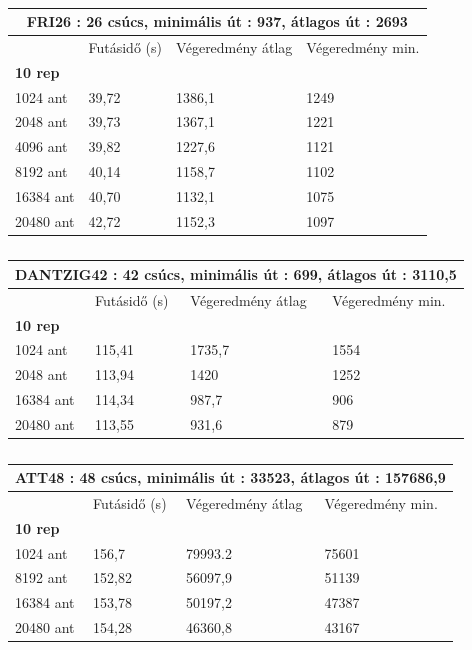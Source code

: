 \begin{table}[ht!]
	\centering
	\begin{tabular}{|p{2cm}||p{3cm}|p{3.5cm}|p{3.5cm}|}
		\hline
		\multicolumn{4}{|c|}{FRI26 : 26 csúcs, minimális út : 937, átlagos út : 2693} \\
		\hline
		& Futásidő (s) & Végeredmény átlag & Végeredmény min.\\
		\hline
		\textbf{10 rep} & & & \\
		1024 ant & 39,72 & 1386,1 & 1249\\
		2048 ant & 39,73 & 1367,1 & 1221\\
		4096 ant & 39,82 & 1227,6 & 1121\\
		8192 ant & 40,14 & 1158,7 & 1102\\
		16384 ant & 40,70 & 1132,1 & 1075\\
		20480 ant & 42,72 & 1152,3 & 1097 \\
		\hline
	\end{tabular}
	\caption{}
	\label{table:TSPv1_26}
\end{table}

\begin{table}[ht!]
	\centering
	\begin{tabular}{|p{2cm}||p{3cm}|p{3.5cm}|p{3.5cm}|}
		\hline
		\multicolumn{4}{|c|}{DANTZIG42 : 42 csúcs, minimális út : 699, átlagos út : 3110,5} \\
		\hline
		& Futásidő (s) & Végeredmény átlag & Végeredmény min.\\
		\hline
		\textbf{10 rep} & & & \\
		1024 ant & 115,41 & 1735,7 & 1554\\
		2048 ant & 113,94 & 1420 & 1252\\
		16384 ant & 114,34 & 987,7 & 906\\
		20480 ant & 113,55 & 931,6 & 879 \\
		\hline
	\end{tabular}
	\caption{}
	\label{table:TSPv1_42}
\end{table}

%


\begin{table}[htbp!]
	\centering
	\begin{tabular}{|p{2cm}||p{3cm}|p{3.5cm}|p{3.5cm}|}
		\hline
		\multicolumn{4}{|c|}{ATT48 : 48 csúcs, minimális út : 33523, átlagos út : 157686,9} \\
		\hline
		& Futásidő (s) & Végeredmény átlag & Végeredmény min.\\
		\hline
		\textbf{10 rep} & & & \\
		1024 ant & 156,7 & 79993.2 & 75601 \\
		8192 ant & 152,82 & 56097,9 & 51139 \\
		16384 ant & 153,78 & 50197,2 & 47387 \\
		20480 ant & 154,28 & 46360,8 & 43167 \\
		\hline
	\end{tabular}
	\caption{}
	\label{table:TSPv1_48}
\end{table}



